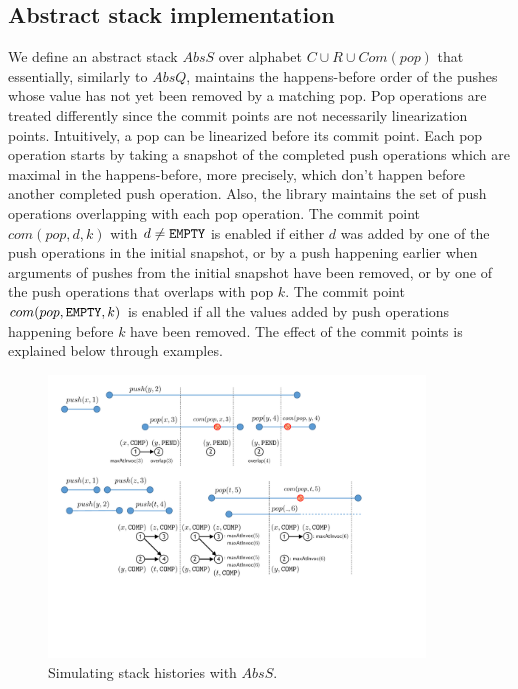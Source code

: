 \vspace{-3mm}
\subsection{Abstract stack implementation}
\vspace{-1mm}
We define an abstract stack $AbsS$ over alphabet $C\cup R\cup Com(pop)$ that essentially, similarly to $AbsQ$, maintains the happens-before order of the pushes whose value has not yet been  removed by a matching pop. Pop operations are treated differently since the commit points are not necessarily linearization points. Intuitively, a pop can be linearized before its commit point. Each pop operation starts by taking a snapshot of the completed push operations which are maximal in the happens-before, more precisely, which don't happen before another completed push operation. Also, the library maintains the set of push operations overlapping with each pop operation. The commit point $com(pop,d,k)$ with $d\neq {\tt EMPTY}$ is enabled if either $d$ was added by one of the push operations in the initial snapshot, or by a push happening earlier when arguments of pushes from the initial snapshot have been removed, or by one of the push operations that overlaps with pop $k$. The commit point $com(pop,{\tt EMPTY},k)$ is enabled if all the values added by push operations happening before $k$ have been removed. The effect of the commit points is explained below through examples.
\vspace{-.4mm}

\begin{figure}[t]
\centering
\includegraphics[width=10cm]{fig-stack.pdf}
%
\vspace{-2mm}
\caption{Simulating stack histories with $AbsS$.}
\label{fig:stackSim}
\vspace{-6.5mm}
\end{figure}

